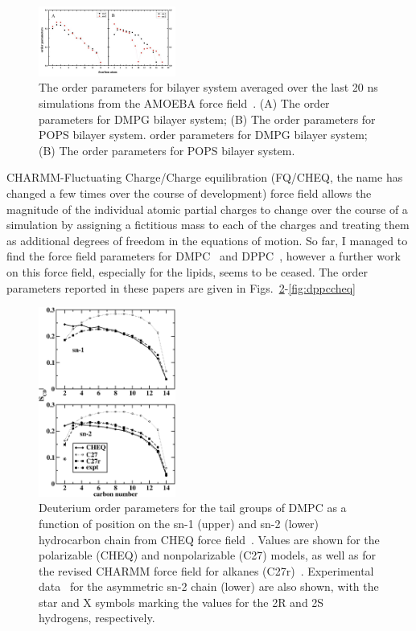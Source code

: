 \documentclass[12pt]{article}
\begin{document}
\begin{figure}[!hbt]
	\centering
	\includegraphics[width=0.4\textwidth]{../Figures/dmpg_pops_order_parameters_amoeba.png}
	\caption{The order parameters for bilayer system averaged over the last 20 ns simulations from the AMOEBA force field~\cite{chu2018anionicpolarizable}. (A) The
		order parameters for DMPG bilayer system; (B) The order parameters for POPS bilayer system. order parameters for DMPG bilayer system; (B) The order parameters for POPS bilayer system.}
	\label{fig:amoebadmpg}
\end{figure}

CHARMM-Fluctuating Charge/Charge equilibration (FQ/CHEQ, the name has changed a
few times over the course of development) force field allows the magnitude of
the individual atomic partial charges to change over the course of a simulation
by assigning a fictitious mass to each of the charges and treating them as
additional degrees of freedom in the equations of motion. So far, I managed to
find the force field parameters for DMPC~\cite{davis2009molecular} and DPPC~\cite{davis2009charge}, however a further work
on this force field, especially for the lipids, seems to be ceased. The order parameters reported in these papers are given in Figs.~\ref{fig:dmpccheq}-\ref{fig:dppccheq}\\

\begin{figure}[!hbt]
  \centering
  \includegraphics[width=0.4\textwidth]{../Figures/dmpc_order_charmmfq.png}
  \caption{Deuterium order parameters for the tail groups of DMPC as a function of position on the sn-1 (upper) and sn-2 (lower) hydrocarbon chain from CHEQ force field~\cite{davis2009molecular}. Values are shown for the polarizable (CHEQ) and nonpolarizable (C27) models, as well as for the revised CHARMM force field for alkanes (C27r)~\cite{klauda2005ab}. Experimental data~\cite{douliez1995restatement} for the asymmetric sn-2 chain (lower) are also shown, with the star and X symbols marking the values for the 2R and 2S hydrogens, respectively.}
  \label{fig:dmpccheq}
\end{figure}
\end{document}
